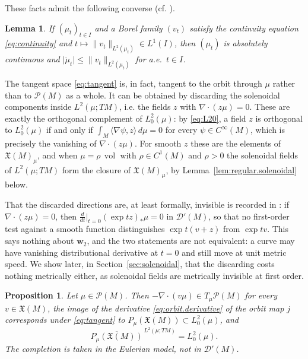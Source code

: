 \documentclass[11pt,reqno]{amsart}
\theoremstyle{plain}
\newtheorem{lem}[thm]{Lemma}
\newtheorem{prp}[thm]{Proposition}
\theoremstyle{definition}
\newcommand{\dw}{\mathbf{w}_2}
\newcommand{\Prob}{\mathcal{P}}
\newcommand{\Dist}{\mathcal{D}'}
\DeclareMathOperator{\vol}{vol}
\begin{document}
These facts admit the following converse (cf. {\cite[Theorem 1.28]{gigli_second_2012}}).

\begin{lem}
\label{lem:gigli.converse}
    If \( (\mu_t)_{t\in I} \) and a Borel family \( (v_t) \) satisfy the continuity equation \eqref{eq:continuity} and \( t\mapsto\lVert v_t\rVert_{L^2(\mu_t)}\in L^1(I) \), then \( (\mu_t) \) is absolutely continuous and \( \lvert\dot\mu_t\rvert\le\lVert v_t\rVert_{L^2(\mu_t)} \) for a.e.\ \( t\in I \).
\end{lem}


The tangent space \eqref{eq:tangent} is, in fact, tangent to the orbit through \( \mu \) rather than to \( \Prob(M) \) as a whole. 
It can be obtained by discarding the solenoidal components inside \( L^2(\mu;TM) \), i.e. the fields \( z \) with \( \nabla\!\cdot(z\mu)=0 \).
These are exactly the orthogonal complement of \( L^2_0(\mu) \): by \eqref{eq:L20}, a field \( z \) is orthogonal to \( L^2_0(\mu) \) if and only if \( \int_M\langle\nabla\psi,z\rangle\,d\mu=0 \) for every \( \psi\in C^\infty(M) \), which is precisely the vanishing of \( \nabla\!\cdot(z\mu) \).
For smooth \( z \) these are the elements of \( \mathfrak X(M)_\mu \), and when \( \mu=\rho\,\vol \) with \( \rho\in C^1(M) \) and \( \rho>0 \) the solenoidal fields of \( L^2(\mu;TM) \) form the closure of \( \mathfrak X(M)_\mu \), by Lemma~\ref{lem:regular.solenoidal} below.

That the discarded directions are, at least formally, invisible is recorded in \cite[\S3]{gomes_differential_2024}: if \( \nabla\!\cdot(z\mu)=0 \), then \( \frac{d}{dt}\big|_{t=0}(\exp tz)_\ast\mu=0 \) in \( \Dist(M) \), so that no first-order test against a smooth function distinguishes \( \exp t(v+z) \) from \( \exp tv \).
This says nothing about \( \dw \), and the two statements are not equivalent: a curve may have vanishing distributional derivative at \( t=0 \) and still move at unit metric speed.
We show later, in Section~\ref{sec:solenoidal}, that the discarding costs nothing metrically either, as solenoidal fields are metrically invisible at first order.


\begin{prp}\label{prp:orbit.tangent}
    Let \( \mu\in\Prob(M) \).
    Then \( -\nabla\!\cdot(v\mu)\in T_\mu\Prob(M) \) for every \( v\in\mathfrak X(M) \), the image of the derivative \eqref{eq:orbit.derivative} of the orbit map \( j \) corresponds under \eqref{eq:tangent} to \( P_\mu\left(\mathfrak X(M)\right)\subset L^2_0(\mu) \), and
    \[
        \overline{P_\mu\left(\mathfrak X(M)\right)}^{\,L^2(\mu;TM)}=L^2_0(\mu).
    \]
    The completion is taken in the Eulerian model, not in \( \Dist(M) \).
\end{prp}
\end{document}
